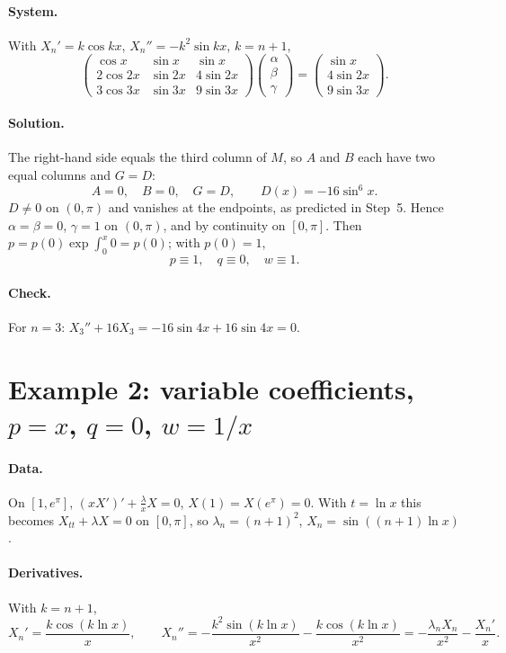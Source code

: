 \documentclass[11pt]{article}
\theoremstyle{remark}
\begin{document}
\paragraph{System.} With $X_n'=k\cos kx$, $X_n''=-k^2\sin kx$, $k=n+1$,
\[
  \begin{pmatrix}
    \cos x & \sin x & \sin x\\
    2\cos2x & \sin2x & 4\sin2x\\
    3\cos3x & \sin3x & 9\sin3x
  \end{pmatrix}
  \begin{pmatrix}\alpha\\ \beta\\ \gamma\end{pmatrix}
  =
  \begin{pmatrix}\sin x\\ 4\sin2x\\ 9\sin3x\end{pmatrix}.
\]

\paragraph{Solution.} The right-hand side equals the third column of $M$, so
$A$ and $B$ each have two equal columns and $G=D$:
\[
  A=0,\quad B=0,\quad G=D,\qquad D(x)=-16\sin^6x .
\]
$D\neq0$ on $(0,\pi)$ and vanishes at the endpoints, as predicted in Step~5.
Hence $\alpha=\beta=0$, $\gamma=1$ on $(0,\pi)$, and by continuity on
$[0,\pi]$. Then $p=p(0)\exp\int_0^x0=p(0)$; with $p(0)=1$,
\[
  \boxed{p\equiv1,\quad q\equiv0,\quad w\equiv1.}
\]
\paragraph{Check.} For $n=3$: $X_3''+16X_3=-16\sin4x+16\sin4x=0$.

\section{Example 2: variable coefficients, $p=x$, $q=0$, $w=1/x$}

\paragraph{Data.} On $[1,e^\pi]$, $(xX')'+\frac{\lambda}{x}X=0$,
$X(1)=X(e^\pi)=0$. With $t=\ln x$ this becomes $X_{tt}+\lambda X=0$ on
$[0,\pi]$, so $\lambda_n=(n+1)^2$, $X_n=\sin((n+1)\ln x)$.

\paragraph{Derivatives.} With $k=n+1$,
\[
  X_n'=\frac{k\cos(k\ln x)}{x},\qquad
  X_n''=-\frac{k^2\sin(k\ln x)}{x^2}-\frac{k\cos(k\ln x)}{x^2}
       =-\frac{\lambda_nX_n}{x^2}-\frac{X_n'}{x}.
\]
\end{document}
